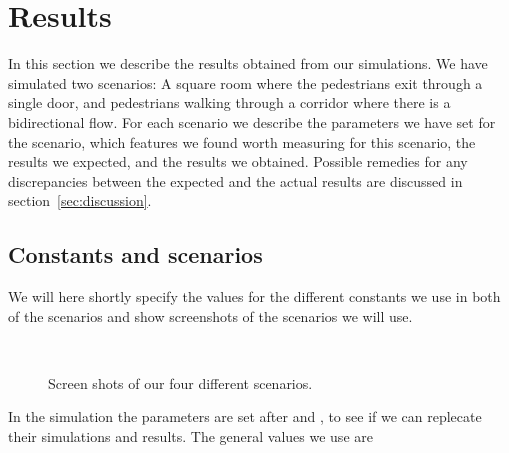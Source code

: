 \section{Results}
\label{sec:results}
In this section we describe the results obtained from our simulations. 
We have simulated two scenarios: A square room where the pedestrians 
exit through a single door, and pedestrians walking through a corridor 
where there is a bidirectional flow. For each scenario we describe the 
parameters we have set for the scenario, which features we found worth 
measuring for this scenario, the results we expected, and the results 
we obtained. Possible remedies for any discrepancies between the expected 
and the actual results are discussed in section~\ref{sec:discussion}.

\subsection{Constants and scenarios}
We will here shortly specify the values for the different constants 
we use in both of the scenarios and show screenshots of the scenarios 
we will use.

\begin{figure}[h]
\centering
{}
\subfloat[Bottleneck.]{\resizebox{7cm}{!}{}}\\
\subfloat[Corridor.]{\resizebox{7cm}{!}{}}
\caption{Screen shots of our four different scenarios.}
\label{fig:fourcases}
\end{figure}

In the simulation the parameters are set after \cite{ABconstant} and 
\cite{self-org}, to see if we can replecate their simulations and results. 
The general values we use are

